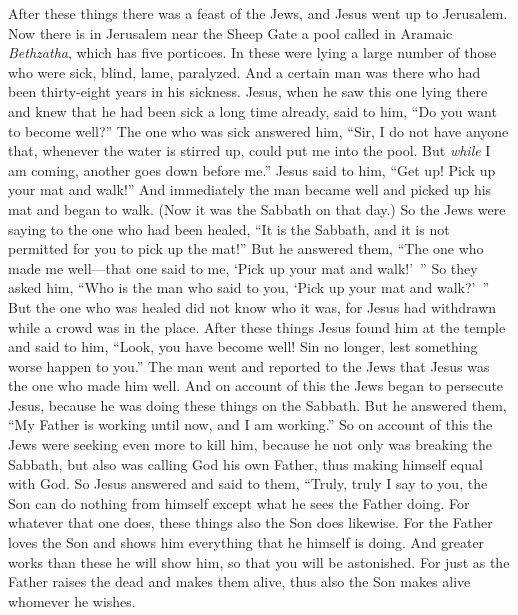 \begin{biblechapter} %
 After these things there was a feast of the Jews, and Jesus went up to Jerusalem.
\verse Now there is in Jerusalem near the Sheep Gate a pool called in Aramaic \textit{Bethzatha}, which has five porticoes.
\verse In these were lying a large number of those who were sick, blind, lame, paralyzed.
\verse And a certain man was there who had been thirty-eight years in his sickness.
\verse Jesus, when he saw this one lying there and knew that he had been sick a long time already, said to him, “Do you want to become well?”
\verse The one who was sick answered him, “Sir, I do not have anyone that, whenever the water is stirred up, could put me into the pool. But \textit{while} I am coming, another goes down before me.”
\verse Jesus said to him, “Get up! Pick up your mat and walk!”
\verse And immediately the man became well and picked up his mat and began to walk. (Now it was the Sabbath on that day.)
\verse So the Jews were saying to the one who had been healed, “It is the Sabbath, and it is not permitted for you to pick up the mat!”
\verse But he answered them, “The one who made me well—that one said to me, ‘Pick up your mat and walk!’ ”
\verse So they asked him, “Who is the man who said to you, ‘Pick up your mat and walk?’ ”
\verse But the one who was healed did not know who it was, for Jesus had withdrawn while a crowd was in the place.
 After these things Jesus found him at the temple and said to him, “Look, you have become well! Sin no longer, lest something worse happen to you.”
\verse The man went and reported to the Jews that Jesus was the one who made him well.
\verse And on account of this the Jews began to persecute Jesus, because he was doing these things on the Sabbath.
\verse But he answered them, “My Father is working until now, and I am working.”
\verse So on account of this the Jews were seeking even more to kill him, because he not only was breaking the Sabbath, but also was calling God his own Father, thus making himself equal with God.
 So Jesus answered and said to them, “Truly, truly I say to you, the Son can do nothing from himself except what he sees the Father doing. For whatever that one does, these things also the Son does likewise.
\verse For the Father loves the Son and shows him everything that he himself is doing. And greater works than these he will show him, so that you will be astonished.
\verse For just as the Father raises the dead and makes them alive, thus also the Son makes alive whomever he wishes.

\end{biblechapter}
